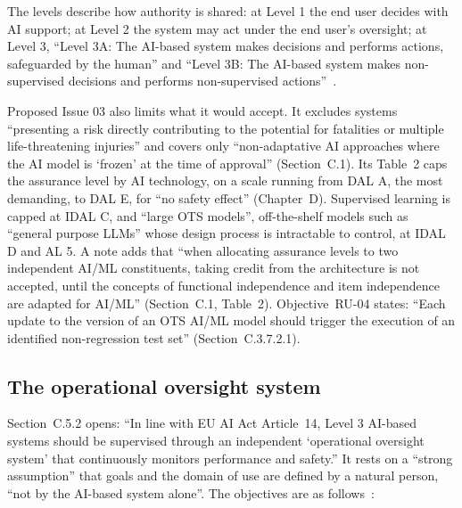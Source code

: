 \documentclass[11pt]{article}
\begin{document}
The levels describe how authority is shared: at Level 1 the end user decides with AI support; at Level 2 the system may act under the end user's oversight; at Level 3, ``Level 3A: The AI-based system makes decisions and performs actions, safeguarded by the human'' and ``Level 3B: The AI-based system makes non-supervised decisions and performs non-supervised actions''~\cite[Figure~4]{easa2026concept}.

Proposed Issue 03 also limits what it would accept. It excludes systems ``presenting a risk directly contributing to the potential for fatalities or multiple life-threatening injuries'' and covers only ``non-adaptative AI approaches where the AI model is `frozen' at the time of approval'' (Section~C.1). Its Table~2 caps the assurance level by AI technology, on a scale running from DAL A, the most demanding, to DAL E, for ``no safety effect'' (Chapter~D). Supervised learning is capped at IDAL C, and ``large OTS models'', off-the-shelf models such as ``general purpose LLMs'' whose design process is intractable to control, at IDAL D and AL 5. A note adds that ``when allocating assurance levels to two independent AI/ML constituents, taking credit from the architecture is not accepted, until the concepts of functional independence and item independence are adapted for AI/ML'' (Section~C.1, Table~2). Objective~RU-04 states: ``Each update to the version of an OTS AI/ML model should trigger the execution of an identified non-regression test set'' (Section~C.3.7.2.1).

\subsection{The operational oversight system}\label{sec:oos}

Section~C.5.2 opens: ``In line with EU AI Act Article~14, Level 3 AI-based systems should be supervised through an independent `operational oversight system' that continuously monitors performance and safety.'' It rests on a ``strong assumption'' that goals and the domain of use are defined by a natural person, ``not by the AI-based system alone''. The objectives are as follows~\cite[Section~C.5.2]{easa2026concept}:
\end{document}
